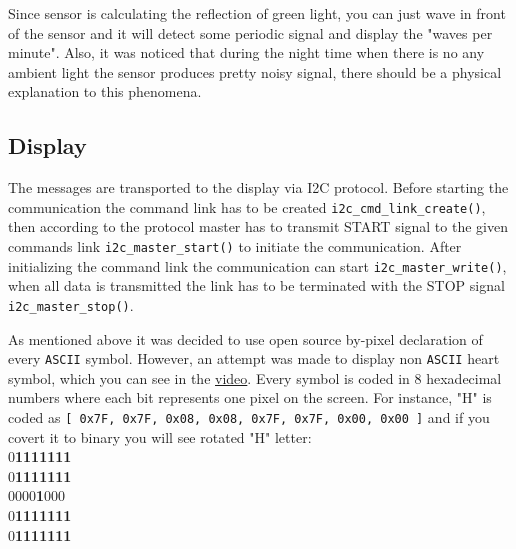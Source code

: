 \documentclass[a4paper, 11pt, twocolumn]{article}
\begin{document}
Since sensor is calculating the reflection of green light, you can just wave in front of the sensor and it will detect some periodic signal and display the "waves per minute". Also, it was noticed that during the night time when there is no any ambient light the sensor produces pretty noisy signal, there should be a physical explanation to this phenomena.

\subsection{Display}

The messages are transported to the display via I2C protocol. Before starting the communication the command link has to be created \texttt{i2c\_cmd\_link\_create()}, then according to the protocol master has to transmit START signal to the given commands link \texttt{i2c\_master\_start()} to initiate the communication. After initializing the command link the communication can start \texttt{i2c\_master\_write()}, when all data is transmitted the link has to be terminated with the STOP signal \texttt{i2c\_master\_stop()}.
\par
As mentioned above it was decided to use open source by-pixel declaration of every \texttt{ASCII} symbol. However, an attempt was made to display non \texttt{ASCII} heart symbol, which you can see in the \href{https://youtu.be/JHA2dlhXHdE}{video}. Every symbol is coded in 8 hexadecimal numbers where each bit represents one pixel on the screen. For instance, "H" is coded as \newline \texttt{[ 0x7F, 0x7F, 0x08, 0x08, 0x7F, 0x7F, 0x00, 0x00 ]} and if you covert it to binary you will see rotated "H" letter:\\
0\textbf{1111111}\\
0\textbf{1111111}\\
0000\textbf{1}000\\
0\textbf{1111111}\\
0\textbf{1111111}\\
\end{document}
